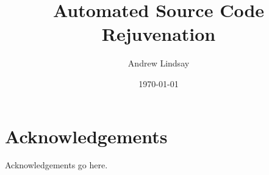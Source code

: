 \documentclass[bsc,frontabs,singlespacing,twoside,parskip,deptreport]{infthesis}
\begin{document}
\title{\vspace{-5.0cm} Automated Source Code Rejuvenation \\ \vspace{1cm}  }

\author{Andrew Lindsay}


\date{\today}

\abstract{
    
}

\maketitle

\section*{Acknowledgements}
Acknowledgements go here. 

\tableofcontents

\end{document}
